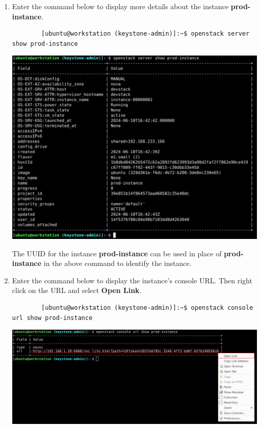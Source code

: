 \documentclass[letterpaper, 12pt]{article}
\begin{document}
\begin{enumerate}
    \item Enter the command below to display more details about the instance \textbf{prod-instance}.
    \begin{lstlisting}
        [ubuntu@workstation (keystone-admin)]:~$ openstack server show prod-instance
    \end{lstlisting}

    \begin{center}
        \includegraphics[width=\linewidth]{images/part2/step9.png}
    \end{center}

    \begin{tipbox}
        The UUID for the instance \textbf{prod-instance} can be used in place of \textbf{prod-instance} in the above command to identify the instance.
    \end{tipbox}

    \item Enter the command below to display the instance's console URL. Then right click on the URL and select
    \textbf{Open Link}.
    \begin{lstlisting}
        [ubuntu@workstation (keystone-admin)]:~$ openstack console url show prod-instance
    \end{lstlisting}

    \begin{center}
        \includegraphics[width=\linewidth]{images/part2/step10.png}
    \end{center}


\end{enumerate}
\end{document}
